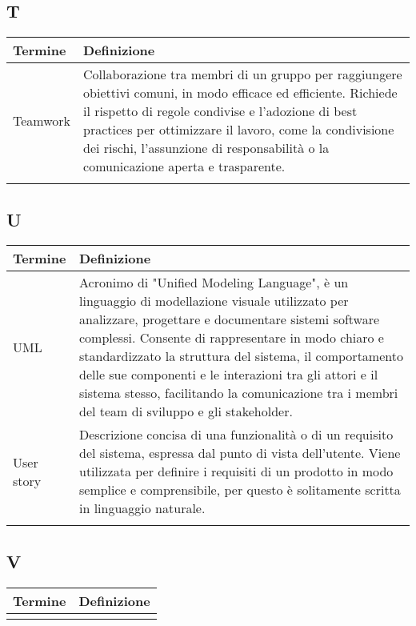 \documentclass[10pt]{article}
\begin{document}
\subsection{T} %
\begin{tabularx}{\textwidth}{|>{\centering\arraybackslash}l|X|}
\hline
\rowcolor[gray]{0.8}
\textbf{Termine} & \textbf{Definizione}\\
\hline
Teamwork & Collaborazione tra membri di un gruppo per raggiungere obiettivi comuni, in modo efficace ed efficiente. Richiede il rispetto di regole condivise e l'adozione di best practices per ottimizzare il lavoro, come la condivisione dei rischi, l'assunzione di responsabilità o la comunicazione aperta e trasparente.\\
\hline
& \\
\hline
\end{tabularx}

\subsection{U} %
\begin{tabularx}{\textwidth}{|>{\centering\arraybackslash}l|X|}
\hline
\rowcolor[gray]{0.8}
\textbf{Termine} & \textbf{Definizione}\\
\hline
UML & Acronimo di "Unified Modeling Language", è un linguaggio di modellazione visuale utilizzato per analizzare, progettare e documentare sistemi software complessi. Consente di rappresentare in modo chiaro e standardizzato la struttura del sistema, il comportamento delle sue componenti e le interazioni tra gli attori e il sistema stesso, facilitando la comunicazione tra i membri del team di sviluppo e gli stakeholder.\\
\hline
User story & Descrizione concisa di una funzionalità o di un requisito del sistema, espressa dal punto di vista dell'utente. Viene utilizzata per definire i requisiti di un prodotto in modo semplice e comprensibile, per questo è solitamente scritta in linguaggio naturale.\\
\hline
 & \\
\hline
\end{tabularx}

\subsection{V} %
\begin{tabularx}{\textwidth}{|>{\centering\arraybackslash}l|X|}
\hline
\rowcolor[gray]{0.8}
\textbf{Termine} & \textbf{Definizione}\\
\hline
 & \\
\hline
\end{tabularx}
\end{document}
